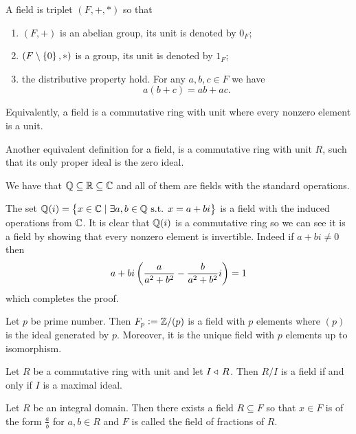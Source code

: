 \documentclass[11pt,a4paper]{article}
\begin{document}
\begin{definition}[Field]
  A field is triplet $(F,+,*)$ so that 
  \begin{enumerate}
    \item[(1)] $(F,+)$ is an abelian group, its unit is denoted by $0_F$;
    \item[(2)] $(F\setminus\left\{0\right\},*)$ is a group, its unit is denoted by $1_F$;
    \item[(3)] the distributive property hold.
      For any $a,b,c \in F$ we have
      \[
        a(b + c) = ab + ac.
      \]
  \end{enumerate}
  Equivalently, a field is a commutative ring with unit where every nonzero
  element is a unit.
\end{definition}

\begin{remark}
  Another equivalent definition for a field,
  is a commutative ring with unit $R$,
  such that its only proper ideal is the zero ideal.
\end{remark}

\begin{example}
  We have that $\mathbb{Q} \subseteq \mathbb{R} \subseteq \mathbb{C}$ and all of them are fields
  with the standard operations.
\end{example}

\begin{example}
  The set $\mathbb{Q}(i) = \left\{x \in \mathbb{C} \mid \exists a,b \in \mathbb{Q} \text{ s.t. } x = a + bi\right\}$
  is a field with the induced operations from $\mathbb{C}$.
  It is clear that $\mathbb{Q}(i)$ is a commutative ring so we can see it is a field
  by showing that every nonzero element is invertible.
  Indeed if $a + bi \neq 0$ then
  \[
    a + bi \del{\frac{a}{a^2 + b^2} - \frac{b}{a^2+b^2} i} = 1
  \]
  which completes the proof.
\end{example}

\begin{example}
  Let $p$ be prime number.
  Then $F_p := \mathbb{Z}/(p)$ is a field with $p$ elements where $(p)$
  is the ideal generated by $p$.
  Moreover, it is the unique field with $p$ elements up to isomorphism.
\end{example}

\begin{example}
  Let $R$ be a commutative ring with unit
  and let $I \triangleleft\, R$.
  Then $R/I$ is a field if and only if $I$ is a maximal ideal.
\end{example}

\begin{example}
  Let $R$ be an integral domain.
  Then there exists a field $R \subseteq F$ so that $x \in F$ is of the
  form $\frac{a}{b}$ for $a,b \in R$ and $F$ is called the field
  of fractions of $R$.
\end{example}
\end{document}
